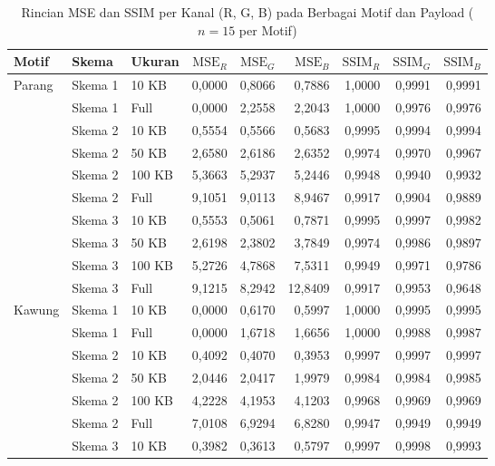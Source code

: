 \documentclass[12pt,journal]{IEEEtran}
\begin{document}
\begin{table}[t]
\centering
\caption{Rincian MSE dan SSIM per Kanal (R, G, B) pada Berbagai Motif dan Payload ($n=15$ per Motif)}
\label{tab:per_channel_mse_ssim}
\scriptsize
\begin{tabular}{@{}lllrrrrrr@{}}
\toprule
Motif & Skema & Ukuran & $\text{MSE}_R$ & $\text{MSE}_G$ & $\text{MSE}_B$ & $\text{SSIM}_R$ & $\text{SSIM}_G$ & $\text{SSIM}_B$ \\
\midrule
Parang      & Skema 1 & 10 KB  & 0,0000 & 0,8066 & 0,7886  & 1,0000 & 0,9991 & 0,9991 \\
            & Skema 1 & Full   & 0,0000 & 2,2558 & 2,2043  & 1,0000 & 0,9976 & 0,9976 \\
            & Skema 2 & 10 KB  & 0,5554 & 0,5566 & 0,5683  & 0,9995 & 0,9994 & 0,9994 \\
            & Skema 2 & 50 KB  & 2,6580 & 2,6186 & 2,6352  & 0,9974 & 0,9970 & 0,9967 \\
            & Skema 2 & 100 KB & 5,3663 & 5,2937 & 5,2446  & 0,9948 & 0,9940 & 0,9932 \\
            & Skema 2 & Full   & 9,1051 & 9,0113 & 8,9467  & 0,9917 & 0,9904 & 0,9889 \\
            & Skema 3 & 10 KB  & 0,5553 & 0,5061 & 0,7871  & 0,9995 & 0,9997 & 0,9982 \\
            & Skema 3 & 50 KB  & 2,6198 & 2,3802 & 3,7849  & 0,9974 & 0,9986 & 0,9897 \\
            & Skema 3 & 100 KB & 5,2726 & 4,7868 & 7,5311  & 0,9949 & 0,9971 & 0,9786 \\
            & Skema 3 & Full   & 9,1215 & 8,2942 & 12,8409 & 0,9917 & 0,9953 & 0,9648 \\
\midrule
Kawung      & Skema 1 & 10 KB  & 0,0000 & 0,6170 & 0,5997  & 1,0000 & 0,9995 & 0,9995 \\
            & Skema 1 & Full   & 0,0000 & 1,6718 & 1,6656  & 1,0000 & 0,9988 & 0,9987 \\
            & Skema 2 & 10 KB  & 0,4092 & 0,4070 & 0,3953  & 0,9997 & 0,9997 & 0,9997 \\
            & Skema 2 & 50 KB  & 2,0446 & 2,0417 & 1,9979  & 0,9984 & 0,9984 & 0,9985 \\
            & Skema 2 & 100 KB & 4,2228 & 4,1953 & 4,1203  & 0,9968 & 0,9969 & 0,9969 \\
            & Skema 2 & Full   & 7,0108 & 6,9294 & 6,8280  & 0,9947 & 0,9949 & 0,9949 \\
            & Skema 3 & 10 KB  & 0,3982 & 0,3613 & 0,5797  & 0,9997 & 0,9998 & 0,9993 \\

\end{tabular}
\end{table}
\end{document}
